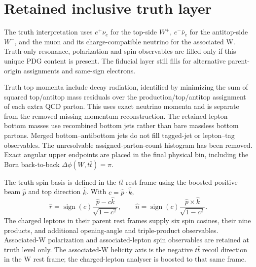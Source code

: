 \documentclass[10pt,a4paper]{article}
\begin{document}
\section{Retained inclusive truth layer}
The truth interpretation uses $e^+\nu_e$ for the top-side $W^+$,
$e^-\bar\nu_e$ for the antitop-side $W^-$, and the muon and its
charge-compatible neutrino for the associated W. Truth-only resonance,
polarization and spin observables are filled only if this unique PDG content
is present. The fiducial layer still fills for alternative parent-origin
assignments and same-sign electrons.

Truth top momenta include decay radiation, identified by minimizing the
sum of squared top/antitop mass residuals over the production/top/antitop
assignment of each extra QCD parton. This uses exact neutrino momenta and
is separate from the removed missing-momentum reconstruction. The retained
lepton--bottom masses use recombined bottom jets rather than bare massless
bottom partons. Merged bottom--antibottom jets do not fill tagged-jet or
lepton--tag observables. The unresolvable assigned-parton-count histogram
has been removed. Exact angular upper endpoints are placed in the final
physical bin, including the Born back-to-back $\Delta\phi(W,t\bar t)=\pi$.

The truth spin basis is defined in the $t\bar t$ rest frame using the boosted
positive beam $\hat p$ and top direction $\hat k$. With $c=\hat p\cdot\hat k$,
\[
 \hat r=\operatorname{sign}(c)\frac{\hat p-c\hat k}{\sqrt{1-c^2}},\qquad
 \hat n=\operatorname{sign}(c)\frac{\hat p\times\hat k}{\sqrt{1-c^2}}.
\]
The charged leptons in their parent rest frames supply six spin cosines,
their nine products, and additional opening-angle and triple-product
observables. Associated-W polarization and associated-lepton spin
observables are retained at truth level only. The associated-W helicity axis
is the negative $t\bar t$ recoil direction in the W rest frame; the
charged-lepton analyser is boosted to that same frame.
\end{document}
